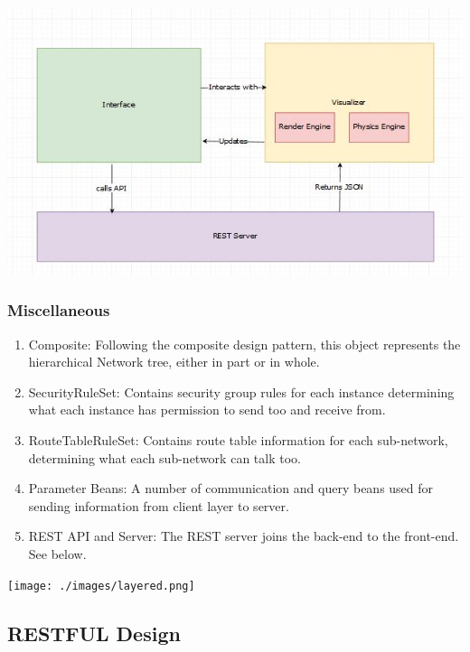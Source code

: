 \documentclass[hidelinks,a4paper,12pt]{article}
\begin{document}
\includegraphics[width=1.00\textwidth]{./images/visualizer.jpg}\\[0.4cm] 


\subsubsection{Miscellaneous }
\begin{enumerate} 
\item Composite: Following the composite design pattern, this object represents the hierarchical Network tree, either in part or in whole. 
\item SecurityRuleSet: Contains security group rules for each instance determining what each instance  has permission to send too and receive from.
\item RouteTableRuleSet: Contains route table information for each sub-network, determining what each sub-network can talk too.
\item Parameter Beans: A number of communication and query beans used for sending information from client layer to server.
\item REST API and Server: The REST server joins the back-end to the front-end. See below.
\end{enumerate}

\texttt{[image: ./images/layered.png]}\\[0.4cm] 
\newpage
\subsection{RESTFUL Design}
\end{document}
